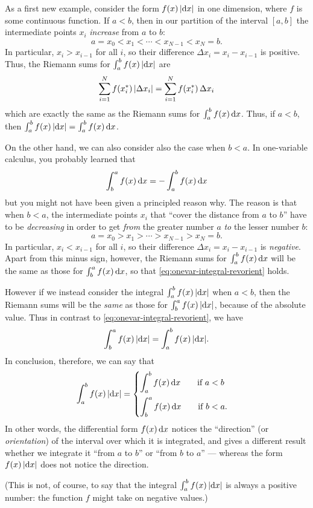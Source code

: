 \documentclass[12pt]{amsart}
\begin{document}
\begin{eg}\label{eg:onevar-absint}
  As a first new example, consider the form $f(x) \, |{\mathrm{d} x}|$ in one dimension, where $f$ is some continuous function.
  If $a<b$, then in our partition of the interval $[a,b]$ the intermediate points $x_i$ \emph{increase} from $a$ to $b$:
  \[ a = x_0 < x_1 < \cdots < x_{N-1} < x_N = b. \]
  In particular, $x_i > x_{i-1}$ for all $i$, so their difference $\Delta x_i = x_i - x_{i-1}$ is positive.
  Thus, the Riemann sums for $\int_a^b f(x) \, |{\mathrm{d} x}|$ are
  \[ \sum_{i=1}^N f({x}_{i}^*)\, |\Delta x_i| = \sum_{i=1}^N f({x}_{i}^*)\, \Delta x_i\]
  which are exactly the same as the Riemann sums for $\int_a^b f(x) \, {\mathrm{d} x}$.
  Thus, if $a<b$, then $\int_a^b f(x) \, |{\mathrm{d} x}| = \int_a^b f(x) \, {\mathrm{d} x}$.

  On the other hand, we can also consider also the case when $b<a$.
  In one-variable calculus, you probably learned that
  \begin{equation}\label{eq:onevar-integral-revorient}
    \int_b^a f(x)\,{\mathrm{d} x} = - \int_a^b f(x) \,{\mathrm{d} x}
  \end{equation}
  but you might not have been given a principled reason why.
  The reason is that when $b<a$, the intermediate points $x_i$ that ``cover the distance from $a$ to $b$'' have to be \emph{decreasing} in order to get \emph{from} the greater number $a$ \emph{to} the lesser number $b$:
  \[ a = x_0 > x_1 > \cdots > x_{N-1} > x_N = b.\]
  In particular, $x_i < x_{i-1}$ for all $i$, so their difference $\Delta x_i = x_i - x_{i-1}$ is \emph{negative}.
  Apart from this minus sign, however, the Riemann sums for $\int_a^b f(x) \,{\mathrm{d} x}$ will be the same as those for $\int_b^a f(x) \,{\mathrm{d} x}$, so that \cref{eq:onevar-integral-revorient} holds.

  However if we instead consider the integral $\int_a^b f(x) \, |{\mathrm{d} x}|$ when $a<b$, then the Riemann sums will be the \emph{same} as those for $\int_b^a f(x) \, |{\mathrm{d} x}|$, because of the absolute value.
  Thus in contrast to \cref{eq:onevar-integral-revorient}, we have
  \begin{equation}\label{eq:onevar-absint-revorient}
    \int_b^a f(x)\,|{\mathrm{d} x}| = \int_a^b f(x) \,|{\mathrm{d} x}|.
  \end{equation}
  In conclusion, therefore, we can say that
  \begin{equation}
    \int_a^b f(x) \,|{\mathrm{d} x}| =
    \begin{cases}
      \displaystyle\int_a^b f(x) \,{\mathrm{d} x} \qquad\text{if } a<b\\[10pt]
      \displaystyle\int_b^a f(x) \,{\mathrm{d} x} \qquad\text{if } b<a.
    \end{cases}\label{eq:onevar-absint}
  \end{equation}
  In other words, the differential form $f(x)\,{\mathrm{d} x}$ notices the ``direction'' (or \emph{orientation}) of the interval over which it is integrated, and gives a different result whether we integrate it ``from $a$ to $b$'' or ``from $b$ to $a$'' --- whereas the form $f(x)\,|{\mathrm{d} x}|$ does not notice the direction.

  (This is not, of course, to say that the integral $\int_a^b f(x) \,|{\mathrm{d} x}|$ is always a positive number: the function $f$ might take on negative values.)
\end{eg}
\end{document}
